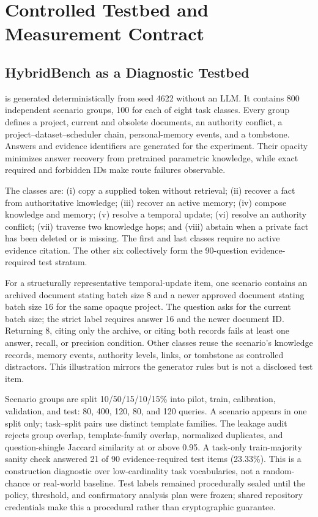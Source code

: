 \section{Controlled Testbed and Measurement Contract}
\label{sec:testbed}

\subsection{HybridBench as a Diagnostic Testbed}

\bench{} is generated deterministically from seed 4622 without an LLM. It contains
800 independent scenario groups, 100 for each of eight task classes. Every group
defines a project, current and obsolete documents, an authority conflict, a
project--dataset--scheduler chain, personal-memory events, and a tombstone. Answers
and evidence identifiers are generated for the experiment. Their opacity minimizes
answer recovery from pretrained parametric knowledge, while exact required and
forbidden IDs make route failures observable.

The classes are: (i) copy a supplied token without retrieval; (ii) recover a fact
from authoritative knowledge; (iii) recover an active memory; (iv) compose
knowledge and memory; (v) resolve a temporal update; (vi) resolve an authority
conflict; (vii) traverse two knowledge hops; and (viii) abstain when a private fact
has been deleted or is missing. The first and last classes require no active
evidence citation. The other six collectively form the 90-question
evidence-required test stratum.

For a structurally representative temporal-update item, one scenario contains an
archived document stating batch size 8 and a newer approved document stating batch
size 16 for the same opaque project. The question asks for the current batch size;
the strict label requires answer 16 and the newer document ID. Returning 8, citing
only the archive, or citing both records fails at least one answer, recall, or
precision condition. Other classes reuse the scenario's knowledge records, memory
events, authority levels, links, or tombstone as controlled distractors. This
illustration mirrors the generator rules but is not a disclosed test item.

Scenario groups are split 10/50/15/10/15\% into pilot, train, calibration,
validation, and test: 80, 400, 120, 80, and 120 queries. A scenario appears in one
split only; task--split pairs use distinct template families. The leakage audit
rejects group overlap, template-family overlap, normalized duplicates, and
question-shingle Jaccard similarity at or above 0.95. A task-only train-majority
sanity check answered 21 of 90 evidence-required test items (23.33\%). This is a
construction diagnostic over low-cardinality task vocabularies, not a random-chance
or real-world baseline. Test labels remained procedurally sealed until the policy,
threshold, and confirmatory analysis plan were frozen; shared repository
credentials make this a procedural rather than cryptographic guarantee.

